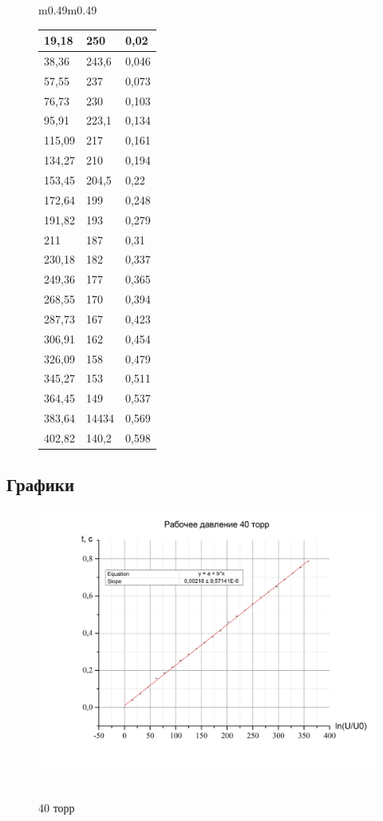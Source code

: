 \documentclass[a4paper,12pt]{article}
\theoremstyle{plain} %
\theoremstyle{definition} %
\theoremstyle{remark} %
\begin{document}
\begin{figure}[H]
\begin{tabular}{m{0.49\linewidth}m{0.49\linewidth}}
\begin{tabular}{|l|l|l|}
19,18  & 250    & 0,02     \\ \hline
38,36  & 243,6  & 0,046    \\ \hline
57,55  & 237    & 0,073    \\ \hline
76,73  & 230    & 0,103    \\ \hline
95,91  & 223,1  & 0,134    \\ \hline
115,09 & 217    & 0,161    \\ \hline
134,27 & 210    & 0,194    \\ \hline
153,45 & 204,5  & 0,22     \\ \hline
172,64 & 199    & 0,248    \\ \hline
191,82 & 193    & 0,279    \\ \hline
211    & 187    & 0,31     \\ \hline
230,18 & 182    & 0,337    \\ \hline
249,36 & 177    & 0,365    \\ \hline
268,55 & 170    & 0,394    \\ \hline
287,73 & 167    & 0,423    \\ \hline
306,91 & 162    & 0,454    \\ \hline
326,09 & 158    & 0,479    \\ \hline
345,27 & 153    & 0,511    \\ \hline
364,45 & 149    & 0,537    \\ \hline
383,64 & 14434  & 0,569    \\ \hline
402,82 & 140,2  & 0,598    \\ \hline
\end{tabular}
\end{tabular}

\end{figure}	

\subsection{Графики}

\begin{figure}[H]
{\includegraphics[width=0.6\linewidth]{graph5.jpg}}\ 
\caption{40 торр}
\end{figure}
\end{document}
